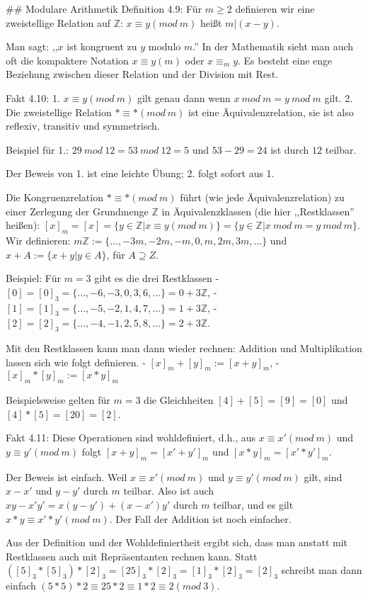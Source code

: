\documentclass[a4paper]{article}
\begin{document}
\begin{multicols}{3}
    ## Modulare Arithmetik
    Definition 4.9: Für $m\geq 2$ definieren wir eine zweistellige Relation auf $\mathbb{Z}$: $x\equiv y (mod\ m)$ heißt $m|(x-y)$.

    Man sagt: ,,$x$ ist kongruent zu $y$ modulo $m$.'' In der Mathematik sieht man auch oft die kompaktere Notation $x\equiv y(m)$ oder $x\equiv_m y$. Es besteht eine enge Beziehung zwischen dieser Relation und der Division mit Rest.

    Fakt 4.10:
    1. $x\equiv y(mod\ m)$ gilt genau dann wenn $x\ mod\ m=y\ mod\ m$ gilt.
    2. Die zweistellige Relation $*\equiv *(mod\ m)$ ist eine Äquivalenzrelation, sie ist also reflexiv, transitiv und symmetrisch.

    Beispiel für 1.: $29\ mod\ 12 = 53\ mod\ 12 = 5$ und $53-29 = 24$ ist durch $12$ teilbar.

    Der Beweis von 1. ist eine leichte Übung; 2. folgt sofort aus 1.

    Die Kongruenzrelation $* \equiv  *(mod\ m)$ führt (wie jede Äquivalenzrelation) zu einer Zerlegung der Grundmenge $\mathbb{Z}$ in Äquivalenzklassen (die hier ,,Restklassen'' heißen): $[x]_m= [x] =\{y\in\mathbb{Z}|x\equiv y(mod\ m)\}=\{y\in\mathbb{Z}|x\ mod\ m=y\ mod\ m\}$. Wir definieren: $m\mathbb{Z}:=\{...,-3m,-2m,-m,0,m,2m,3m,...\}$ und $x+A:=\{x+y|y\in A\}$, für $A\supseteq Z$.

    Beispiel: Für $m=3$ gibt es die drei Restklassen
    - $[0] = [0]_3 =\{...,-6,-3,0,3,6,...\}= 0 + 3\mathbb{Z}$,
    - $[1] = [1]_3 =\{...,-5,-2,1,4,7,...\}= 1 + 3\mathbb{Z}$,
    - $[2] = [2]_3 =\{...,-4,-1,2,5,8,...\}= 2 + 3\mathbb{Z}$.

    Mit den Restklassen kann man dann wieder rechnen: Addition und Multiplikation lassen sich wie folgt definieren.
    - $[x]_m+ [y]_m := [x+y]_m$,
    - $[x]_m*[y]_m := [x*y]_m$

    Beispielsweise gelten für $m=3$ die Gleichheiten $[4] + [5] = [9] = [0]$ und $[4]*[5] =[20] = [2]$.

    Fakt 4.11: Diese Operationen sind wohldefiniert, d.h., aus $x\equiv x′(mod\ m)$ und $y\equiv y′(mod\ m)$ folgt $[x+y]_m= [x′+y′]_m$ und $[x*y]_m= [x′*y′]_m$.

    Der Beweis ist einfach. Weil $x\equiv x′ (mod\ m)$ und $y\equiv y′ (mod\ m)$ gilt, sind $x-x′$ und $y-y′$ durch $m$ teilbar. Also ist auch $xy-x′y′=x(y-y′) + (x-x′)y′$ durch $m$ teilbar, und es gilt $x*y\equiv x′*y′ (mod\ m)$. Der Fall der Addition ist noch einfacher.

    Aus der Definition und der Wohldefiniertheit ergibt sich, dass man anstatt mit Restklassen auch mit Repräsentanten rechnen kann. Statt $([5]_3 *[5]_3)*[2]_3 = [25]_3 *[2]_3 = [1]_3 *[2]_3 = [2]_3$ schreibt man dann einfach $(5*5)* 2 \equiv  25 * 2 \equiv  1 * 2 \equiv 2 (mod\ 3)$.


\end{multicols}
\end{document}
